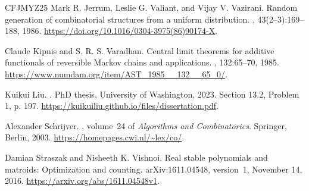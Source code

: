 \documentclass[11pt]{article}
\theoremstyle{definition}
\begin{document}
\begin{thebibliography}{CFJMYZ25}
Mark R. Jerrum, Leslie G. Valiant, and Vijay V. Vazirani.
\newblock Random generation of combinatorial structures from a uniform
  distribution.
, 43(2--3):169--188, 1986.
\newblock \url{https://doi.org/10.1016/0304-3975(86)90174-X}.

Claude Kipnis and S. R. S. Varadhan.
\newblock Central limit theorems for additive functionals of reversible
  Markov chains and applications.
, 132:65--70, 1985.
\newblock \url{https://www.numdam.org/item/AST_1985__132__65_0/}.

Kuikui Liu.
.
\newblock PhD thesis, University of Washington, 2023.
\newblock Section 13.2, Problem 1, p. 197.
  \url{https://kuikuiliu.github.io/files/dissertation.pdf}.

Alexander Schrijver.
, volume~24
  of {\em Algorithms and Combinatorics}.
\newblock Springer, Berlin, 2003.
\newblock \url{https://homepages.cwi.nl/~lex/co/}.

Damian Straszak and Nisheeth K. Vishnoi.
\newblock Real stable polynomials and matroids: Optimization and counting.
\newblock arXiv:1611.04548, version~1, November 14, 2016.
\newblock \url{https://arxiv.org/abs/1611.04548v1}.

\end{thebibliography}
\end{document}
